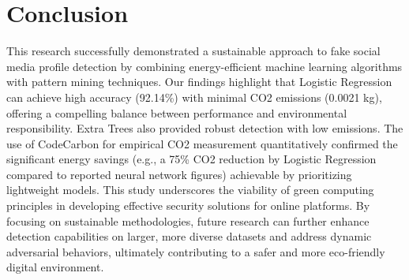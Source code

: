 \documentclass[conference]{IEEEtran}
\begin{document}
\section{Conclusion}
\label{sec:conclude}
This research successfully demonstrated a sustainable approach to fake social media profile detection by combining energy-efficient machine learning algorithms with pattern mining techniques. Our findings highlight that Logistic Regression can achieve high accuracy (92.14\%) with minimal CO2 emissions (0.0021 kg), offering a compelling balance between performance and environmental responsibility. Extra Trees also provided robust detection with low emissions. The use of CodeCarbon for empirical CO2 measurement quantitatively confirmed the significant energy savings (e.g., a 75\% CO2 reduction by Logistic Regression compared to reported neural network figures) achievable by prioritizing lightweight models. This study underscores the viability of green computing principles in developing effective security solutions for online platforms. By focusing on sustainable methodologies, future research can further enhance detection capabilities on larger, more diverse datasets and address dynamic adversarial behaviors, ultimately contributing to a safer and more eco-friendly digital environment.
\end{document}

